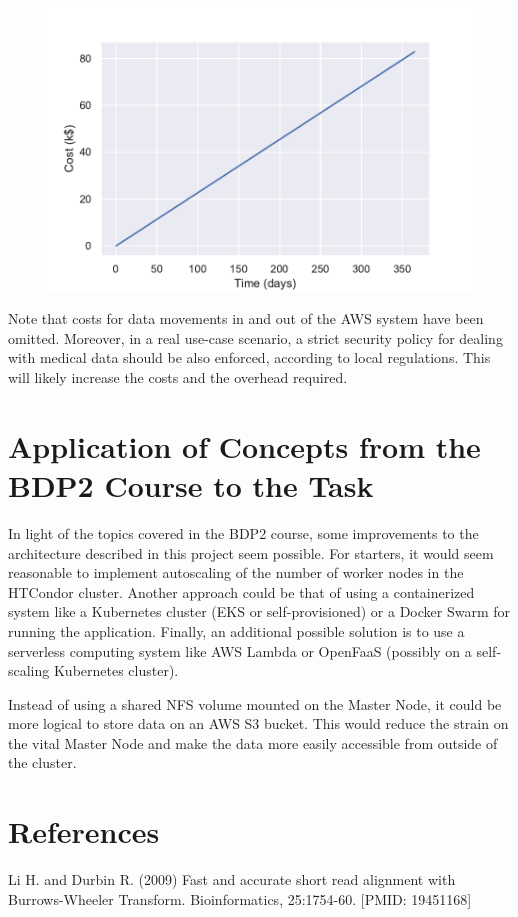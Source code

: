 \documentclass{article}
\begin{document}
\begin{figure}[!h]
    \center
    \includegraphics[width=.8\textwidth]{./images/cost_graph.pdf}
\end{figure}

\FloatBarrier

Note that costs for data movements in and out of the AWS system have been omitted.
Moreover, in a real use-case scenario, a strict security policy for dealing with medical data should be also enforced, according to local regulations.
This will likely increase the costs and the overhead required.

\section{Application of Concepts from the BDP2 Course to the Task}
In light of the topics covered in the BDP2 course, some improvements to the architecture described in this project seem possible.
For starters, it would seem reasonable to implement autoscaling of the number of worker nodes in the HTCondor cluster.
Another approach could be that of using a containerized system like a Kubernetes cluster (EKS or self-provisioned) or a Docker Swarm for running the application.
Finally, an additional possible solution is to use a serverless computing system like AWS Lambda or OpenFaaS (possibly on a self-scaling Kubernetes cluster).

Instead of using a shared NFS volume mounted on the Master Node, it could be more logical to store data on an AWS S3 bucket.
This would reduce the strain on the vital Master Node and make the data more easily accessible from outside of the cluster.

\section{References}
Li H. and Durbin R. (2009) Fast and accurate short read alignment with Burrows-Wheeler Transform. Bioinformatics, 25:1754-60. [PMID: 19451168]\\
\end{document}
